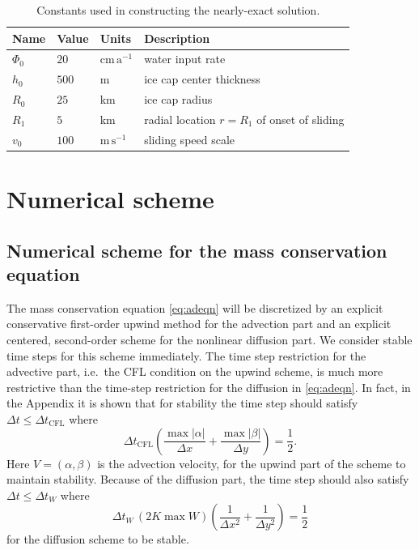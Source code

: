 \documentclass[11pt,final]{amsart}%
\begin{document}
\begin{table}[ht]
  \centering
  \caption{Constants used in constructing the nearly-exact solution.}
  \begin{tabular}{lllp{3.0in}}
    \textbf{Name} & \textbf{Value} & \textbf{Units} & \textbf{Description}\\
\hline
    $\Phi_0$ & $20$ & $\text{cm}\,\text{a}^{-1}$ & water input rate \\
    $h_0$ & $500$ & m & ice cap center thickness \\
    $R_0$ & $25$  & km & ice cap radius \\
    $R_1$ & $5$   & km & radial location $r=R_1$ of onset of sliding \\
    $v_0$ & $100$ & $\text{m}\,\text{s}^{-1}$ & sliding speed scale \\
    \hline
  \end{tabular}
 \label{tab:verifconstants}
\end{table}

\section{Numerical scheme}  \label{sec:num}

\subsection*{Numerical scheme for the mass conservation equation}  The mass conservation equation \eqref{eq:adeqn} will be discretized by an explicit conservative first-order upwind method for the advection part and an explicit centered, second-order scheme for the nonlinear diffusion part.  We consider stable time steps for this scheme immediately.  The time step restriction for the advective part, i.e.~the CFL condition on the upwind scheme, is much more restrictive than the time-step restriction for the diffusion in \eqref{eq:adeqn}.  In fact, in the Appendix it is shown that for stability the time step should satisfy $\Delta t \le \Delta t_{\text{CFL}}$ where
\begin{equation}
\Delta t_{\text{CFL}} \left(\frac{\max |\alpha|}{\Delta x} + \frac{\max |\beta|}{\Delta y}\right) = \frac{1}{2}. \label{eq:dtCFL}
\end{equation}
Here $V=(\alpha,\beta)$ is the advection velocity, for the upwind part of the scheme to maintain stability.  Because of the diffusion part, the time step should also satisfy $\Delta t \le \Delta t_{W}$ where
\begin{equation}
\Delta t_W\, (2 K \max W) \left(\frac{1}{\Delta x^2} + \frac{1}{\Delta y^2}\right) = \frac{1}{2} \label{eq:dtDIFFW}
\end{equation}
for the diffusion scheme to be stable.
\end{document}
